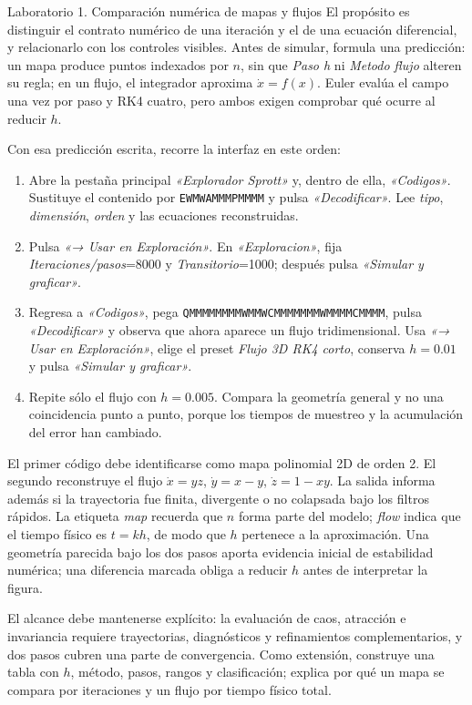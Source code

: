 \documentclass[11pt]{article}
\newcommand{\codigo}[1]{\texttt{#1}}
\newcommand{\boton}[1]{\textsf{\itshape «#1»}}
\newcommand{\control}[1]{\textsf{\itshape #1}}
\begin{document}
\begin{laboratorio}{Laboratorio 1. Comparación numérica de mapas y flujos}
El propósito es distinguir el contrato numérico de una iteración y el de una ecuación
diferencial, y relacionarlo con los controles visibles. Antes de simular, formula una
predicción: un mapa produce puntos indexados por \(n\), sin que \control{Paso h} ni
\control{Metodo flujo} alteren su regla; en un flujo, el integrador aproxima
\(\dot{x}=f(x)\). Euler evalúa el campo una vez por paso y RK4 cuatro, pero ambos exigen
comprobar qué ocurre al reducir \(h\).

Con esa predicción escrita, recorre la interfaz en este orden:
\begin{enumerate}
  \item Abre la pestaña principal \boton{Explorador Sprott} y, dentro de ella,
  \boton{Codigos}. Sustituye el contenido por \codigo{EWMWAMMMPMMMM} y pulsa
  \boton{Decodificar}. Lee \control{tipo}, \control{dimensión}, \control{orden} y las
  ecuaciones reconstruidas.
  \item Pulsa \boton{→ Usar en Exploración}. En \boton{Exploracion}, fija
  \control{Iteraciones/pasos}=8000 y \control{Transitorio}=1000; después pulsa
  \boton{Simular y graficar}.
  \item Regresa a \boton{Codigos}, pega
  \codigo{QMMMMMMMMWMMWCMMMMMMMWMMMMCMMMM}, pulsa \boton{Decodificar} y observa que
  ahora aparece un flujo tridimensional. Usa \boton{→ Usar en Exploración}, elige el
  preset \control{Flujo 3D RK4 corto}, conserva \(h=0.01\) y pulsa
  \boton{Simular y graficar}.
  \item Repite sólo el flujo con \(h=0.005\). Compara la geometría general y no una
  coincidencia punto a punto, porque los tiempos de muestreo y la acumulación del error
  han cambiado.
\end{enumerate}

El primer código debe identificarse como mapa polinomial 2D de orden 2. El segundo
reconstruye el flujo
\(\dot{x}=yz\), \(\dot{y}=x-y\), \(\dot{z}=1-xy\). La salida informa además si la
trayectoria fue finita, divergente o no colapsada bajo los filtros rápidos. La etiqueta
\control{map} recuerda que \(n\) forma parte del modelo; \control{flow} indica que el
tiempo físico es \(t=kh\), de modo que \(h\) pertenece a la aproximación. Una geometría
parecida bajo los dos pasos aporta evidencia inicial de estabilidad numérica; una
diferencia marcada obliga a reducir \(h\) antes de interpretar la figura.

El alcance debe mantenerse explícito: la evaluación de caos, atracción e invariancia
requiere trayectorias, diagnósticos y refinamientos complementarios, y dos pasos cubren una parte de
convergencia. Como extensión, construye una tabla con \(h\), método, pasos, rangos y
clasificación; explica por qué un mapa se compara por iteraciones y un flujo por tiempo
físico total.
\end{laboratorio}
\end{document}
